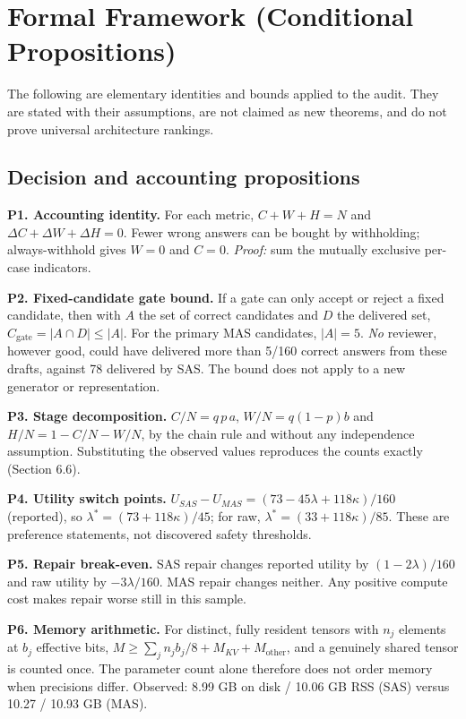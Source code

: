 \documentclass[letterpaper]{article}
\begin{document}
\section{Formal Framework (Conditional Propositions)}\label{formal-framework-conditional-propositions}

The following are elementary identities and bounds applied to the audit. They are stated with their assumptions, are not claimed as new theorems, and do not prove universal architecture rankings.

\subsection{Decision and accounting propositions}\label{decision-and-accounting-propositions}

\textbf{P1. Accounting identity.} For each metric, \(C+W+H=N\) and \(\Delta C+\Delta W+\Delta H=0\). Fewer wrong answers can be bought by withholding; always-withhold gives \(W=0\) and \(C=0\). \emph{Proof:} sum the mutually exclusive per-case indicators.

\textbf{P2. Fixed-candidate gate bound.} If a gate can only accept or reject a fixed candidate, then with \(A\) the set of correct candidates and \(D\) the delivered set, \(C_{\text{gate}}=|A\cap D|\le|A|\). For the primary MAS candidates, \(|A|=5\). \emph{No} reviewer, however good, could have delivered more than 5/160 correct answers from these drafts, against 78 delivered by SAS. The bound does not apply to a new generator or representation.

\textbf{P3. Stage decomposition.} \(C/N=q\,p\,a\), \(W/N=q(1-p)b\) and \(H/N=1-C/N-W/N\), by the chain rule and without any independence assumption. Substituting the observed values reproduces the counts exactly (Section 6.6).

\textbf{P4. Utility switch points.} \(U_{SAS}-U_{MAS}=(73-45\lambda+118\kappa)/160\) (reported), so \(\lambda^*=(73+118\kappa)/45\); for raw, \(\lambda^*=(33+118\kappa)/85\). These are preference statements, not discovered safety thresholds.

\textbf{P5. Repair break-even.} SAS repair changes reported utility by \((1-2\lambda)/160\) and raw utility by \(-3\lambda/160\). MAS repair changes neither. Any positive compute cost makes repair worse still in this sample.

\textbf{P6. Memory arithmetic.} For distinct, fully resident tensors with \(n_j\) elements at \(b_j\) effective bits, \(M\ge\sum_j n_j b_j/8+M_{KV}+M_{\text{other}}\), and a genuinely shared tensor is counted once. The parameter count alone therefore does not order memory when precisions differ. Observed: 8.99 GB on disk / 10.06 GB RSS (SAS) versus 10.27 / 10.93 GB (MAS).
\end{document}
